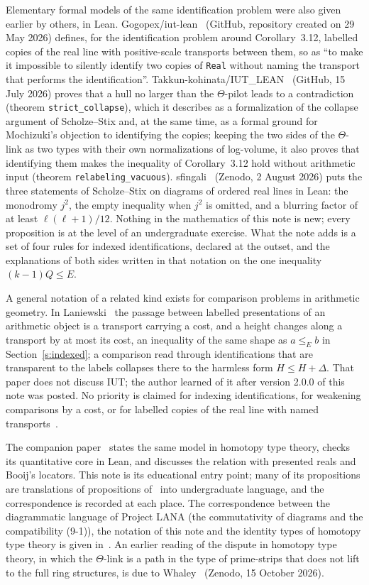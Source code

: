 \documentclass[11pt,a4paper]{article}
\newcommand{\q}[1]{``#1''}
\theoremstyle{plain}
\theoremstyle{definition}
\theoremstyle{remark}
\begin{document}
Elementary formal models of the same identification problem were also given earlier by others, in Lean.
Gogopex/iut-lean~\cite{Go} (GitHub, repository created on 29 May 2026) defines, for the identification problem around
Corollary~3.12, labelled copies of the real line with positive-scale transports between them, so as \q{to make it
impossible to silently identify two copies of \texttt{Real} without naming the transport that performs the
identification}. Takkun-kohinata/IUT\_LEAN~\cite{TK} (GitHub, 15 July 2026) proves that a hull no larger than the
$\Theta$-pilot leads to a contradiction (theorem \texttt{strict\_collapse}), which it describes as a formalization of
the collapse argument of Scholze--Stix and, at the same time, as a formal ground for Mochizuki's objection to
identifying the copies; keeping the two sides of the $\Theta$-link as two types with their own normalizations of
log-volume, it also proves that identifying them makes the inequality of Corollary~3.12 hold without arithmetic input
(theorem \texttt{relabeling\_vacuous}). sfingali~\cite{Sf} (Zenodo, 2 August 2026) puts the three statements of
Scholze--Stix on diagrams of ordered real lines in Lean: the monodromy $j^2$, the empty inequality when $j^2$ is
omitted, and a blurring factor of at least $\ell(\ell+1)/12$. Nothing in the mathematics of this note is new; every
proposition is at the level of an undergraduate exercise. What the note adds is a set of four rules for indexed
identifications, declared at the outset, and the explanations of both sides written in that notation on the one
inequality $(k-1)Q\le E$.

A general notation of a related kind exists for comparison problems in arithmetic geometry. In Laniewski~\cite{La} the
passage between labelled presentations of an arithmetic object is a transport carrying a cost, and a height changes
along a transport by at most its cost, an inequality of the same shape as $a\le_E b$ in
Section~\ref{s:indexed}; a comparison read through identifications that are transparent to the labels collapses there
to the harmless form $H\le H+\Delta$. That paper does not discuss IUT; the author learned of it after version 2.0.0 of
this note was posted. No priority is claimed for indexing identifications, for weakening comparisons by a cost, or for
labelled copies of the real line with named transports~\cite{Go}.

The companion paper~\cite{Ur} states the same model in homotopy type theory, checks its quantitative core in Lean, and
discusses the relation with presented reals and Booij's locators. This note is its educational entry point; many of its
propositions are translations of propositions of~\cite{Ur} into undergraduate language, and the correspondence is
recorded at each place. The correspondence between the diagrammatic language of Project LANA (the commutativity of
diagrams and the compatibility (9-1)), the notation of this note and the identity types of homotopy type theory is given
in~\cite[\S6.4]{Ur}. An earlier reading of the dispute in homotopy type theory, in which the $\Theta$-link is a path in
the type of prime-strips that does not lift to the full ring structures, is due to Whaley~\cite{Wh} (Zenodo,
15 October 2026).
\end{document}
